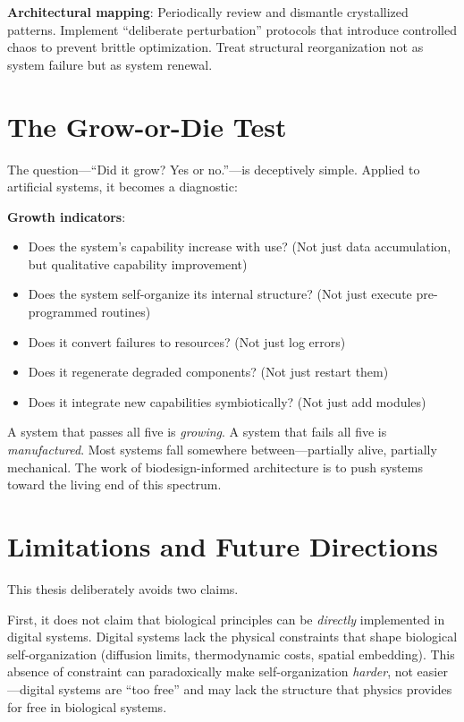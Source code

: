 \documentclass[11pt,a4paper]{article}
\begin{document}
\textbf{Architectural mapping}: Periodically review and dismantle crystallized patterns. Implement ``deliberate perturbation'' protocols that introduce controlled chaos to prevent brittle optimization. Treat structural reorganization not as system failure but as system renewal.

\section{The Grow-or-Die Test}

The question---``Did it grow? Yes or no.''---is deceptively simple. Applied to artificial systems, it becomes a diagnostic:

\textbf{Growth indicators}:
\begin{itemize}
  \item Does the system's capability increase with use? (Not just data accumulation, but qualitative capability improvement)
  \item Does the system self-organize its internal structure? (Not just execute pre-programmed routines)
  \item Does it convert failures to resources? (Not just log errors)
  \item Does it regenerate degraded components? (Not just restart them)
  \item Does it integrate new capabilities symbiotically? (Not just add modules)
\end{itemize}

A system that passes all five is \emph{growing}. A system that fails all five is \emph{manufactured}. Most systems fall somewhere between---partially alive, partially mechanical. The work of biodesign-informed architecture is to push systems toward the living end of this spectrum.

\section{Limitations and Future Directions}

This thesis deliberately avoids two claims.

First, it does not claim that biological principles can be \emph{directly} implemented in digital systems. Digital systems lack the physical constraints that shape biological self-organization (diffusion limits, thermodynamic costs, spatial embedding). This absence of constraint can paradoxically make self-organization \emph{harder}, not easier---digital systems are ``too free'' and may lack the structure that physics provides for free in biological systems.
\end{document}
